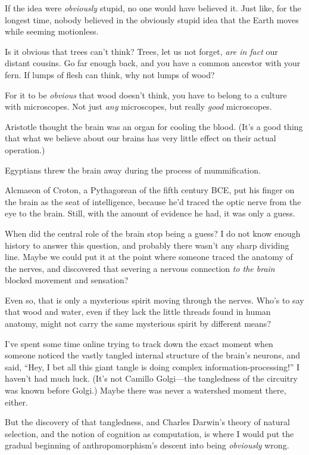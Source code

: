 {
 If the idea were \textit{obviously} stupid, no one would have
believed it. Just like, for the longest time, nobody believed in the
obviously stupid idea that the Earth moves while seeming motionless.}

{
 Is it obvious that trees can't think? Trees, let
us not forget, \textit{are in fact} our distant cousins. Go far enough
back, and you have a common ancestor with your fern. If lumps of flesh
can think, why not lumps of wood?}

{
 For it to be \textit{obvious} that wood doesn't
think, you have to belong to a culture with microscopes. Not just
\textit{any} microscopes, but really \textit{good} microscopes.}

{
 Aristotle thought the brain was an organ for cooling the blood.
(It's a good thing that what we believe about our
brains has very little effect on their actual operation.)}

{
 Egyptians threw the brain away during the process of
mummification.}

{
 Alcmaeon of Croton, a Pythagorean of the fifth century BCE, put
his finger on the brain as the seat of intelligence, because
he'd traced the optic nerve from the eye to the brain.
Still, with the amount of evidence he had, it was only a guess.}

{
 When did the central role of the brain stop being a guess? I do
not know enough history to answer this question, and probably there
wasn't any sharp dividing line. Maybe we could put it
at the point where someone traced the anatomy of the nerves, and
discovered that severing a nervous connection \textit{to the brain}
blocked movement and sensation?}

{
 Even so, that is only a mysterious spirit moving through the
nerves. Who's to say that wood and water, even if they
lack the little threads found in human anatomy, might not carry the
same mysterious spirit by different means?}

{
 I've spent some time online trying to track down
the exact moment when someone noticed the vastly tangled internal
structure of the brain's neurons, and said,
``Hey, I bet all this giant tangle is doing complex
information-processing!'' I haven't
had much luck. (It's not Camillo Golgi---the
tangledness of the circuitry was known before Golgi.) Maybe there was
never a watershed moment there, either.}

{
 But the discovery of that tangledness, and Charles
Darwin's theory of natural selection, and the notion of
cognition as computation, is where I would put the gradual beginning of
anthropomorphism's descent into being
\textit{obviously} wrong.}

